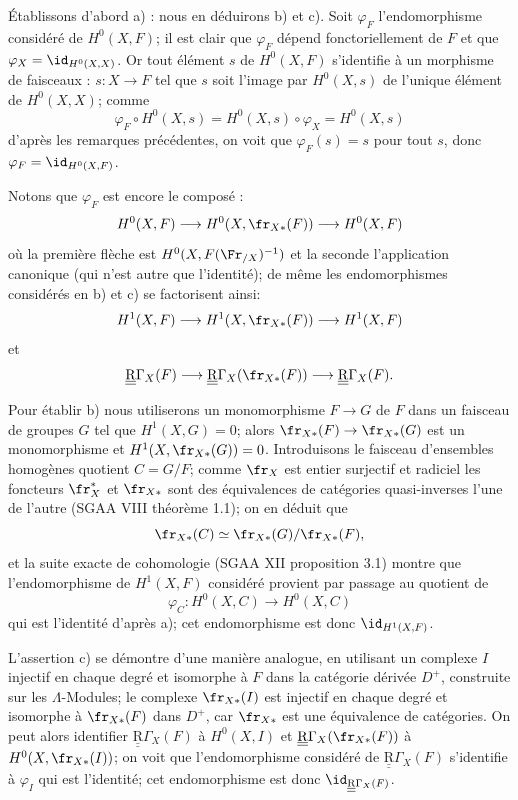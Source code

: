 Établissons d'abord a) : nous en déduirons b) et c). Soit $\varphi_F$ l'endomorphisme considéré de $H^0(X,F)$; il est clair que $\varphi_F$ dépend fonctoriellement de $F$ et que $\varphi_X=\id_{H^0(X,X)}$. Or tout élément $s$ de $H^0(X,F)$ s'identifie à un morphisme de faisceaux : $s:X\to F$ tel que $s$ soit l'image par $H^0(X,s)$ de l'unique élément de $H^0(X,X)$; comme
\[
\varphi_F\circ H^0(X,s)=H^0(X,s)\circ\varphi_X=H^0(X,s)
\]
d'après les remarques précédentes, on voit que $\varphi_F(s)=s$ pour tout $s$, donc $\varphi_F=\id_{H^0(X,F)}$.

Notons que $\varphi_F$ est encore le composé :
\[
H^0(X,F)\longrightarrow H^0(X,\fr_{X*}(F))
\longrightarrow H^0(X,F)
\]
où la première flèche est $H^0(X,F(\Fr_{/X})^{-1})$ et la seconde l'application canonique (qui n'est autre que l'identité); de même les endomorphismes considérés en b) et c) se factorisent ainsi:
\[
H^1(X,F)\longrightarrow H^1(X,\fr_{X*}(F))
\longrightarrow H^1(X,F)
\]
et
\[
\underline{\underline{\mathrm{R}}}\Gamma_X(F)\longrightarrow \underline{\underline{\mathrm{R}}}\Gamma_X(\fr_{X*}(F))
\longrightarrow \underline{\underline{\mathrm{R}}}\Gamma_X(F).
\]

Pour établir b) nous utiliserons un monomorphisme $F\to G$ de $F$ dans un faisceau de groupes $G$ tel que $H^1(X,G)=0$; alors $\fr_{X*}(F)\to\fr_{X*}(G)$ est un monomorphisme et $H^1(X,\fr_{X*}(G))=0$. Introduisons le faisceau d'ensembles homogènes quotient $C=G/F$;
comme $\fr_X$ est entier surjectif et radiciel les foncteurs $\fr_X^*$ et $\fr_{X*}$ sont des équivalences de catégories quasi-inverses l'une de l'autre (SGAA VIII théorème 1.1); on en déduit que
\[
\fr_{X*}(C)\simeq\fr_{X*}(G)/\fr_{X*}(F),
\]
et la suite exacte de cohomologie (SGAA XII proposition 3.1) montre que l'endomorphisme de $H^1(X,F)$ considéré provient par passage au quotient de
\[
\varphi_C:H^0(X,C)\longrightarrow H^0(X,C)
\]
qui est l'identité d'après a); cet endomorphisme est donc $\id_{H^1(X,F)}$.

L'assertion c) se démontre d'une manière analogue, en utilisant un complexe $I$ injectif en chaque degré et isomorphe à $F$ dans la catégorie dérivée $D^+$, construite sur les $\Lambda$-Modules; le complexe $\fr_{X*}(I)$ est injectif en chaque degré et isomorphe à $\fr_{X*}(F)$ dans $D^+$, car $\fr_{X*}$ est une équivalence de catégories. On peut alors identifier $\underline{\underline{\mathrm{R}}}\Gamma_X(F)$ à $H^0(X,I)$ et $\underline{\underline{\mathrm{R}}}\Gamma_X(\fr_{X*}(F))$ à $H^0(X,\fr_{X*}(I))$; on voit que l'endomorphisme considéré de $\underline{\underline{\mathrm{R}}}\Gamma_X(F)$ s'identifie à $\varphi_I$ qui est l'identité; cet endomorphisme est donc $\id_{\underline{\underline{\mathrm{R}}}\Gamma_X(F)}$.

